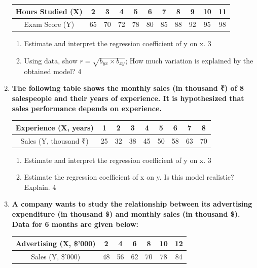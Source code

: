 \documentclass[a4paper,oneside]{book}
\begin{document}
\begin{enumerate}
\begin{table}[h!]
\centering
\begin{tabular}{c|c|c|c|c|c|c|c|c|c|c}
Hours Studied (X) & 2 & 3 & 4 & 5 & 6 & 7 & 8 & 9 & 10 & 11 \\ \hline
Exam Score (Y) & 65 & 70 & 72 & 78 & 80 & 85 & 88 & 92 & 95 & 98 \\
\end{tabular}
\end{table}
  
  \begin{enumerate}
    \item  
	Estimate and interpret the regression coefficient of y on x. \hfill 3
    \item
	Using data, show $r = \sqrt{b_{yx} \times b_{xy}}$; How much variation is explained by the obtained model? \hfill 4
  \end{enumerate}
  
  \item
  \textbf{The following table shows the monthly sales (in thousand ₹) of 8 salespeople and their years of experience. It is hypothesized that sales performance depends on experience.}

\begin{table}[h!]
\centering
\begin{tabular}{c|c|c|c|c|c|c|c|c}
Experience (X, years) & 1 & 2 & 3 & 4 & 5 & 6 & 7 & 8 \\ \hline
Sales (Y, thousand ₹) & 25 & 32 & 38 & 45 & 50 & 58 & 63 & 70 \\
\end{tabular}
\end{table}

\begin{enumerate}
    \item
    Estimate and interpret the regression coefficient of y on x. \hfill 3
    
    \item
    Estimate the regression coefficient of x on y. Is this model realistic? Explain. \hfill 4
\end{enumerate}

\item
  \textbf{A company wants to study the relationship between its advertising expenditure (in thousand \$) and monthly sales (in thousand \$). Data for 6 months are given below:}

\begin{table}[h!]
\centering
\begin{tabular}{c|c|c|c|c|c|c}
Advertising (X, \$'000) & 2 & 4 & 6 & 8 & 10 & 12 \\ \hline
Sales (Y, \$'000) & 48 & 56 & 62 & 70 & 78 & 84 \\
\end{tabular}
\end{table}


\end{enumerate}
\end{document}
